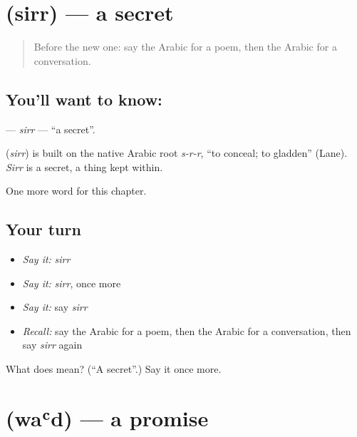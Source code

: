 \section[\texorpdfstring{\ar{سر} (sirr)}{سر (sirr)}]{ (sirr) — a secret}

\label{lesson:AR-C216-sirr}



\begin{quote}
Before the new one: say the Arabic for a poem, then the Arabic for a conversation.
\end{quote}

\subsection*{You'll want to know: }
\textbf{} — \emph{sirr} — \textquotedblleft{}a secret\textquotedblright{}.

\begin{cousinweb}
\textbf{} (\emph{sirr}) is built on the native Arabic root \emph{s-r-r}, \textquotedblleft{}to conceal; to gladden\textquotedblright{} (Lane). \emph{Sirr} is a secret, a thing kept within.
\end{cousinweb}

\begin{grammarlens}[title={What you've built}]
One more word for this chapter.
\end{grammarlens}

\subsection*{Your turn}
\begin{itemize}
\raggedright
  \item \emph{Say it:} \emph{sirr}
  \item \emph{Say it:} \emph{sirr}, once more
  \item \emph{Say it:} say \emph{sirr}
  \item \emph{Recall:} say the Arabic for a poem, then the Arabic for a conversation, then say \emph{sirr} again
\end{itemize}

\begin{tcolorbox}[breakable,colback=teal!4,colframe=teal!35!black,title={Before you move on}]
What does  mean? (\textquotedblleft{}A secret\textquotedblright{}.) Say it once more.
\end{tcolorbox}
\section[\texorpdfstring{\ar{وعد} (waʿd)}{وعد (waʿd)}]{ (waʿd) — a promise}

